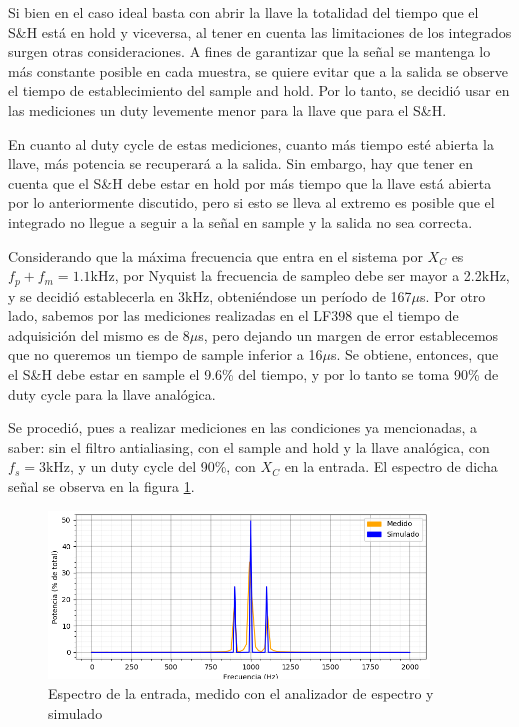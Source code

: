 \documentclass[a4paper]{article}
\begin{document}
Si bien en el caso ideal basta con abrir la llave la totalidad del tiempo que el S\&H est\'a en hold y viceversa, al tener en cuenta las limitaciones de los integrados surgen otras consideraciones. A fines de garantizar que la se\~nal se mantenga lo m\'as constante posible en cada muestra, se quiere evitar que a la salida se observe el tiempo de establecimiento del sample and hold. Por lo tanto, se decidi\'o usar en las mediciones un duty levemente menor para la llave que para el S\&H.

En cuanto al duty cycle de estas mediciones, cuanto m\'as tiempo est\'e abierta la llave, m\'as potencia se recuperar\'a a la salida. 
Sin embargo, hay que tener en cuenta que el S\&H debe estar en hold por m\'as tiempo que la llave est\'a abierta por lo anteriormente discutido, pero si esto se lleva al extremo es posible que el integrado no llegue a seguir a la se\~nal en sample y la salida no sea correcta. 

Considerando que la m\'axima frecuencia que entra en el sistema por $X_C$ es $f_p+f_m=1.1$kHz, por Nyquist la frecuencia de sampleo debe ser mayor a 2.2kHz, y se decidi\'o establecerla en 3kHz, obteni\'endose un per\'iodo de 167$\mu$s. Por otro lado, sabemos por las mediciones realizadas en el LF398 que el tiempo de adquisici\'on del mismo es de 8$\mu$s, pero dejando un margen de error establecemos que no queremos un tiempo de sample inferior a 16$\mu$s. Se obtiene, entonces, que el S\&H debe estar en sample el 9.6\% del tiempo, y por lo tanto se toma 90\% de duty cycle para la llave anal\'ogica. 

Se procedi\'o, pues a realizar mediciones en las condiciones ya mencionadas, a saber: sin el filtro antialiasing, con el sample and hold y la llave anal\'ogica, con $f_s=3$kHz, y un duty cycle del 90\%, con $X_C$ en la entrada. El espectro de dicha se\~nal se observa en la figura \ref{fig:ej7_espectro_in}.

\begin{figure}[htb]
	\centering
	\includegraphics[width=0.9\textwidth]{ej7_meds/7_in.png}
	\caption{Espectro de la entrada, medido con el analizador de espectro y simulado}
	\label{fig:ej7_espectro_in}
\end{figure}
\end{document}
